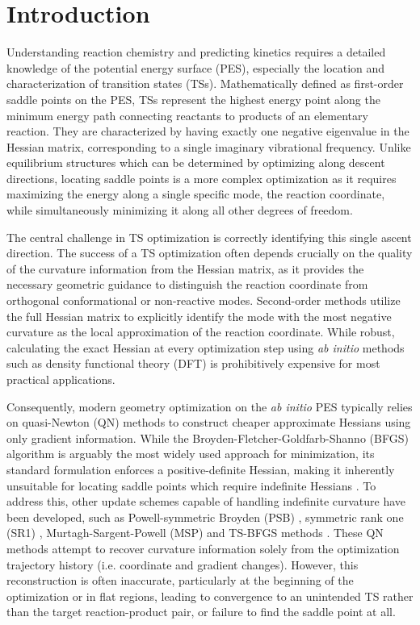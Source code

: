 \documentclass[12pt]{article}
\begin{document}
\section{Introduction}
Understanding reaction chemistry and predicting kinetics requires a detailed knowledge of the potential energy surface (PES), especially the location and characterization of transition states (TSs). Mathematically defined as first-order saddle points on the PES, TSs represent the highest energy point along the minimum energy path connecting reactants to products of an elementary reaction. They are characterized by having exactly one negative eigenvalue in the Hessian matrix, corresponding to a single imaginary vibrational frequency. Unlike equilibrium structures which can be determined by optimizing along descent directions, locating saddle points is a more complex optimization as it requires maximizing the energy along a single specific mode, the reaction coordinate, while simultaneously minimizing it along all other degrees of freedom.\par

The central challenge in TS optimization is correctly identifying this single ascent direction. The success of a TS optimization often depends crucially on the quality of the curvature information from the Hessian matrix, as it provides the necessary geometric guidance to distinguish the reaction coordinate from orthogonal conformational or non-reactive modes. Second-order methods utilize the full Hessian matrix to explicitly identify the mode with the most negative curvature as the local approximation of the reaction coordinate. While robust, calculating the exact Hessian at every optimization step using \textit{ab initio} methods such as density functional theory (DFT) is prohibitively expensive for most practical applications. 

Consequently, modern geometry optimization on the \textit{ab initio} PES typically relies on quasi-Newton (QN) methods to construct cheaper approximate Hessians using only gradient information. While the Broyden-Fletcher-Goldfarb-Shanno (BFGS) algorithm is arguably the most widely used approach for minimization, its standard formulation enforces a positive-definite Hessian, making it inherently unsuitable for locating saddle points which require indefinite Hessians \cite{bfgs1, bfgs2, bfgs3, bfgs4}. To address this, other update schemes capable of handling indefinite curvature have been developed, such as Powell-symmetric Broyden (PSB) \cite{psb1, psb2}, symmetric rank one (SR1) \cite{sr1}, Murtagh-Sargent-Powell (MSP) \cite{msp1, msp2} and TS-BFGS \cite{tsbfgs1, tsbfgs2} methods \cite{qnmethods}. These QN methods attempt to recover curvature information solely from the optimization trajectory history (i.e. coordinate and gradient changes). However, this reconstruction is often inaccurate, particularly at the beginning of the optimization or in flat regions, leading to convergence to an unintended TS rather than the target reaction-product pair, or failure to find the saddle point at all.\par 
\end{document}
